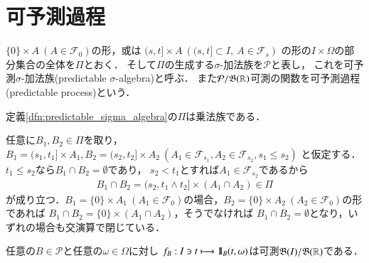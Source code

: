 \section{可予測過程}
	\begin{screen}
		\begin{dfn}
			$\{0\} \times A\ (A \in \mathcal{F}_0)$の形，或は
			$(s,t] \times A\ \left( (s,t] \subset I,\ A \in \mathcal{F}_s \right)$
			の形の$I \times \Omega$の部分集合の全体を$\Pi$とおく．
			そして$\Pi$の生成する$\sigma$-加法族を$\mathcal{P}$と表し，
			これを可予測$\sigma$-加法族(predictable $\sigma$-algebra)と呼ぶ．
			また$\mathcal{P}/\mathfrak{B}(\mathbb{R})$可測の関数を可予測過程(predictable process)という．
			\label{dfn:predictable_sigma_algebra}
		\end{dfn}
	\end{screen}
	
	\begin{screen}
		\begin{lem}[$\Pi$は乗法族]
			定義\ref{dfn:predictable_sigma_algebra}の$\Pi$は乗法族である．
			\label{lem:predictable_Pi_pi_system}
		\end{lem}
	\end{screen}
	
	\begin{prf}
		任意に$B_1,B_2 \in \Pi$を取り，
		$B_1 = (s_1,t_1] \times A_1,B_2 = (s_2,t_2] \times A_2\ (A_1 \in \mathcal{F}_{s_1},A_2 \in \mathcal{F}_{s_2},s_1 \leq s_2)$
		と仮定する．$t_1 \leq s_2$なら$B_1 \cap B_2 = \emptyset$であり，
		$s_2 < t_1$とすれば$A_1 \in \mathcal{F}_{s_2}$であるから
		\begin{align}
			B_1 \cap B_2 =  (s_2, t_1 \wedge t_2] \times \left(A_1 \cap A_2\right) \in \Pi
		\end{align}
		が成り立つ．$B_1 = \{0\} \times A_1\ (A_1 \in \mathcal{F}_0)$の場合，$B_2 = \{0\} \times A_2\ (A_2 \in \mathcal{F}_0)$の形であれば
		$B_1 \cap B_2 = \{0\} \times \left(A_1 \cap A_2\right)$，そうでなければ
		$B_1 \cap B_2 = \emptyset$となり，いずれの場合も交演算で閉じている．
		\QED
		\end{prf}
	
	\begin{screen}
		\begin{lem}[可予測単関数の時間に関する可測性]
			任意の$B \in \mathcal{P}$と任意の$\omega \in \Omega$に対し
			$f_B:I \ni t \longmapsto \mbox{1}\hspace{-0.25em}\mbox{l}_B(t,\omega)$は可測$\mathfrak{B}(I)/\mathfrak{B}(\mathbb{R})$である．
			\label{lem:measurability_of_predictable_simple_functions}
		\end{lem}
	\end{screen}
	
